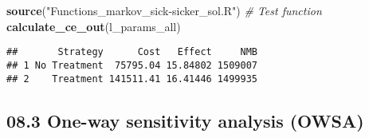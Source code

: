 \documentclass[
]{article}
\newenvironment{Shaded}{\begin{snugshade}}{\end{snugshade}}
\newcommand{\CommentTok}[1]{\textcolor[rgb]{0.56,0.35,0.01}{\textit{#1}}}
\newcommand{\KeywordTok}[1]{\textcolor[rgb]{0.13,0.29,0.53}{\textbf{#1}}}
\newcommand{\NormalTok}[1]{#1}
\newcommand{\StringTok}[1]{\textcolor[rgb]{0.31,0.60,0.02}{#1}}
\begin{document}
\begin{Shaded}
\begin{Highlighting}[]
\KeywordTok{source}\NormalTok{(}\StringTok{"Functions_markov_sick-sicker_sol.R"}\NormalTok{)}
\CommentTok{# Test function}
\KeywordTok{calculate_ce_out}\NormalTok{(l_params_all)}
\end{Highlighting}
\end{Shaded}

\begin{verbatim}
##       Strategy      Cost   Effect     NMB
## 1 No Treatment  75795.04 15.84802 1509007
## 2    Treatment 141511.41 16.41446 1499935
\end{verbatim}

\hypertarget{one-way-sensitivity-analysis-owsa}{%
\subsection{08.3 One-way sensitivity analysis
(OWSA)}\label{one-way-sensitivity-analysis-owsa}}
\end{document}
